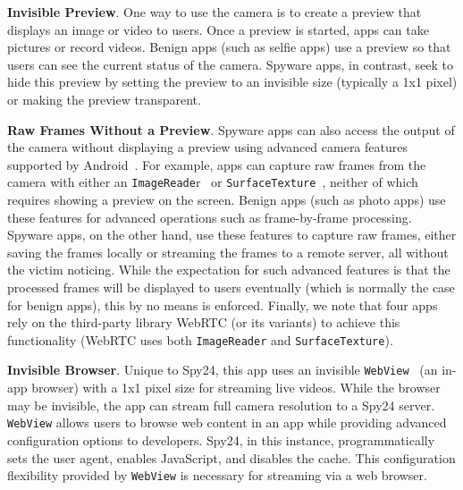 
\textbf{Invisible Preview}. One way to use the camera is to create a preview that displays an image or video to users. Once a preview is started, apps can take pictures or record videos. Benign apps (such as selfie apps) use a preview so that users can see the current status of the camera. Spyware apps, in contrast, seek to hide this preview by setting the preview to an invisible size (typically a 1x1 pixel) or making the preview transparent.

\textbf{Raw Frames Without a Preview}.
Spyware apps can also access the output of the camera without displaying a
preview using advanced camera features supported by
Android~\cite{Cameraca74:online}. For example, apps can capture raw frames from
the camera with either an \texttt{ImageReade}r~\cite{Cameraca74:online} or
\texttt{SurfaceTexture}~\cite{SurfaceT78:online}, neither of which requires showing a
preview on the screen.
Benign apps (such as photo apps) use these
features for advanced operations such as frame-by-frame processing. Spyware
apps, on the other hand, use these features to capture raw frames, either saving
the frames locally or streaming the frames to a remote server, all without the
victim noticing. While the expectation for such advanced features is that the
processed frames will be displayed to users eventually (which is normally the
case for benign apps), this by no means is enforced. Finally, we note that four
apps rely on the third-party library WebRTC (or its variants) to achieve this functionality (WebRTC uses both \texttt{ImageReader} and \texttt{SurfaceTexture}).


\textbf{Invisible Browser}. Unique to Spy24, this app uses an invisible
\texttt{WebView}~\cite{WebViewA25:online} (an in-app browser) with a 1x1 pixel size for
streaming live videos. While the browser may be invisible, the app can stream
full camera resolution to a Spy24 server.
\texttt{WebView} allows users to browse web content in an app while providing advanced
configuration options to developers. Spy24, in this instance, programmatically sets
the user agent, enables JavaScript, and disables the cache. This configuration
flexibility provided by \texttt{WebView} is necessary for streaming via a web browser.

